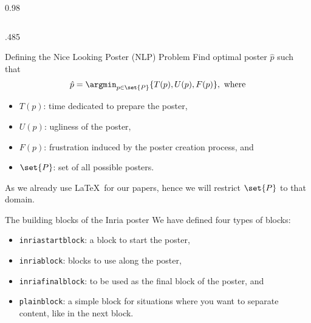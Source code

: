 \documentclass[final,svgnames,english]{beamer}
\begin{document}
\begin{frame}[fragile]{}
\begin{columns}[T]
\begin{column}{0.98\linewidth}
\begin{columns}[T]
\begin{column}{.485\linewidth}
            \begin{inriablock}{Defining the Nice Looking Poster (NLP) Problem}
                Find optimal poster $\hat{p}$ such that
                \[
                  \hat{p} = \argmin_{p\in\set{P}}{\left\lbrace T(p), U(p), F(p)\right\rbrace},\ \text{where}
                \]
                \begin{itemize}
                  \item $T(p)$: time dedicated to prepare the poster,
                  \item $U(p)$: ugliness of the poster,
                  \item $F(p)$: frustration induced by the poster creation process, and
                  \item $\set{P}$: set of all possible posters.
                \end{itemize}
                \begin{takeaway}
                  As we already use \LaTeX\ for our papers, hence we will restrict $\set{P}$ to that domain.
                \end{takeaway}
            \end{inriablock}

            \begin{inriablock}{The building blocks of the Inria poster}
            We have defined four types of blocks:
            \begin{itemize}
                \item \texttt{inriastartblock}: a block to start the poster,
                \item \texttt{inriablock}: blocks to use along the poster,
                \item \texttt{inriafinalblock}: to be used as the final block of the poster, and
                \item \texttt{plainblock}: a simple block for situations where you want to separate content, like in the next block.
            \end{itemize}
            \end{inriablock}

            \begin{plainblock}{}
            \centering
             
            \end{plainblock}


\end{column}
\end{columns}
\end{column}
\end{columns}
\end{frame}
\end{document}
